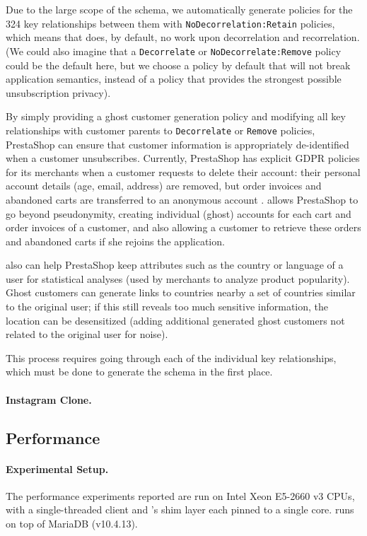 Due to the large scope of the schema, we automatically generate policies for the 324 key relationships between them 
with \texttt{NoDecorrelation:Retain} policies, which means that \sys{} does, by default, no work upon
decorrelation and recorrelation. (We could also imagine that a \texttt{Decorrelate} or
\texttt{NoDecorrelate:Remove} policy could be
the default here, but we choose a policy by default that will not break application semantics,
instead of a policy that provides the strongest possible unsubscription privacy).

By simply providing a ghost customer generation policy and modifying all key relationships with
customer parents to \texttt{Decorrelate} or \texttt{Remove} policies, PrestaShop can ensure that
customer information is appropriately de-identified when a customer unsubscribes.
Currently, PrestaShop has explicit GDPR policies for its merchants when a customer requests to delete
their account: their personal account details (age, email, address) are removed, but order invoices
and abandoned carts are transferred to an anonymous account
.
\sys{} allows PrestaShop to go beyond pseudonymity, creating individual (ghost) accounts for each
cart and order invoices of a customer, and also allowing a customer to retrieve these orders and
abandoned carts if she rejoins the application.

\sys{} also can help PrestaShop keep attributes such as the country or language of a user for
statistical analyses (used by merchants to analyze product popularity). Ghost customers can generate
links to countries nearby a set of countries similar to the original user; if this still reveals too
much sensitive information, the location can be desensitized (adding additional generated ghost
customers not related to the original user for noise).

This process requires going through each of the individual key relationships, which must be done to
generate the schema in the first place.

\paragraph{Instagram Clone.}

\subsection{Performance}
\paragraph{Experimental Setup.}
The performance experiments reported are run on Intel Xeon E5-2660 v3 CPUs, with a
single-threaded client and \sys{}'s shim layer each pinned to a single core. \sys{} runs on top of 
MariaDB (v10.4.13). 

